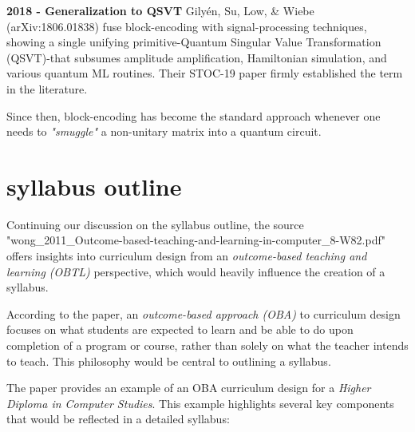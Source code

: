 \documentclass[11pt,a4paper]{article}
\begin{document}
	\textbf{2018 - Generalization to QSVT}  
	Gilyén, Su, Low, \& Wiebe (arXiv:1806.01838) fuse block-encoding with signal-processing techniques, showing a single unifying primitive-Quantum Singular Value Transformation (QSVT)-that subsumes amplitude amplification, Hamiltonian simulation, and various quantum ML routines. Their STOC-19 paper firmly established the term in the literature.
	
	Since then, block-encoding has become the standard approach whenever one needs to \textit{"smuggle"} a non-unitary matrix into a quantum circuit.
	

\section{syllabus outline}

	Continuing our discussion on the syllabus outline, the source \cite{Wong:2011} "wong\_2011\_Outcome-based-teaching-and-learning-in-computer\_8-W82.pdf" 
	offers insights into curriculum design from an \emph{outcome-based teaching and learning (OBTL)} perspective, 
	which would heavily influence the creation of a syllabus.
	
	According to the paper, an \emph{outcome-based approach (OBA)} to curriculum design focuses on what students are expected to learn and be able to do upon completion of a program or course, rather than solely on what the teacher intends to teach. This philosophy would be central to outlining a syllabus.
	
	The paper provides an example of an OBA curriculum design for a \emph{Higher Diploma in Computer Studies}. This example highlights several key components that would be reflected in a detailed syllabus:
	
\end{document}
